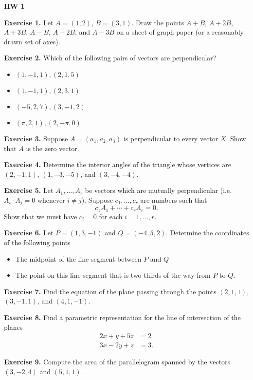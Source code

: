 \documentclass{article}
\begin{document}

\textbf{HW 1}

\textbf{Exercise 1.}
 Let $A = (1,2)$, $B = (3,1)$. Draw the points $A+B$, $A+2B$, $A+3B$, $A-B$, $A-2B$, and $A - 3B$
 on a sheet of graph paper (or a reasonably drawn set of axes).

\textbf{Exercise 2.} Which of the following pairs of vectors are perpendicular?
\begin{itemize}
    \item $(1,-1,1), (2,1,5)$ 
    \item $(1,-1,1), (2,3,1)$ 
    \item $(-5,2,7), (3,-1,2)$
    \item $(\pi,2,1), (2,-\pi,0)$
\end{itemize}

\textbf{Exercise 3.}
Suppose $A = (a_1,a_2,a_3)$ is perpendicular to every vector $X$. Show that
$A$ is the zero vector.

\textbf{Exercise 4.}  Determine the interior angles of the triangle whose vertices are 
$(2, -1, 1)$, $(1, - 3, - 5)$, and $(3, -4, -4)$.

\textbf{Exercise 5.} Let $A_1, \ldots, A_r$ be vectors which are mutually perpendicular
(i.e. $A_i \cdot A_j = 0$ whenever $i \neq j$). Suppose $c_1, \ldots, c_r$ are numbers such that
\[c_1 A_1 + \cdots + c_r A_r = 0.\]
Show that we must have $c_i = 0$ for each $i=1,\ldots, r$.

\textbf{Exercise 6.} Let $P = (1,3, -1)$ and $Q = (-4,5,2)$. 
Determine the coordinates of the following points
\begin{itemize}
    \item The midpoint of the line segment between $P$ and $Q$
    \item The point on this line segment that is two thirds of the way from $P$ to $Q$.
\end{itemize}

\textbf{Exercise 7.} Find the equation of the plane passing through the points
$(2,1,1)$, $(3,-1,1)$, and $(4,1,-1)$.

\textbf{Exercise 8.} Find a parametric representation for the
line of intersection of the planes 
\begin{align*}
    2x + y + 5z &= 2\\
    3x - 2y + z &= 3.
\end{align*}

\textbf{Exercise 9.} Compute the area of the parallelogram spanned
by the vectors $(3,-2,4)$ and $(5,1,1)$.

\end{document}
